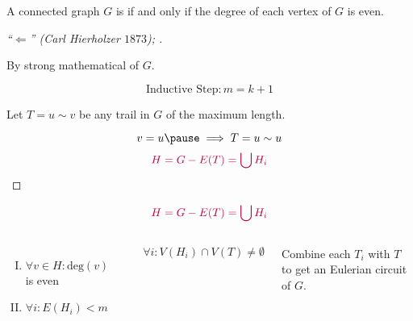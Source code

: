 
\begin{frame}{}
  \begin{theorem}
    A connected graph $G$ is  if and only if the degree of each vertex of $G$ is even.
  \end{theorem}

  \pause
  \begin{proof}[``$\Longleftarrow$'' (Carl Hierholzer $1873$); \pause{}]
    \pause
    \begin{center}
      By strong mathematical  of $G$.
    \end{center}
    \pause
    \[
      \text{Inductive Step}: m = k + 1
    \]

    \pause
    \begin{center}
      Let $T = u \sim v$ be any trail in $G$ of the maximum length.
    \end{center}
    \pause
    \[
      v = u \pause \implies T = u \sim u
    \]
    \pause
    \[
      \textcolor{purple}{H = G - E(T) = \bigcup H_i}
    \]
  \end{proof}
\end{frame}

\begin{frame}{}
  \[
    \textcolor{purple}{H = G - E(T) = \bigcup H_i}
  \]

  \begin{columns}
      \pause
      \begin{enumerate}[(I)]
	\item $\forall v \in H: \text{deg}(v)$ is even
	\item $\forall i: E(H_i) < m$
      \end{enumerate}

      \pause
      \vspace{0.30cm}
      \begin{center}
      \end{center}

      \pause
      \[
	\forall i: V(H_i) \cap V(T) \neq \emptyset
      \]

      \pause
      \begin{center}
	Combine each $T_i$ with $T$ to get an Eulerian circuit of $G$.
      \end{center}
  \end{columns}
\end{frame}
